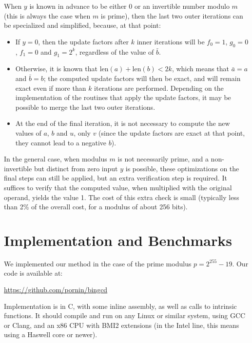 \documentclass{llncs}
\newcommand{\bitlength}{\text{len}}
\begin{document}
When $y$ is known in advance to be either 0 or an invertible number
modulo $m$ (this is always the case when $m$ is prime), then the last
two outer iterations can be specialized and simplified, because, at
that point:
\begin{itemize}

    \item If $y = 0$, then the update factors after $k$ inner
    iterations will be $f_0 = 1$, $g_0 = 0$, $f_1 = 0$ and $g_1 = 2^k$,
    regardless of the value of $\bar b$.

    \item Otherwise, it is known that $\bitlength(a) + \bitlength(b) <
    2k$, which means that $\bar a = a$ and $\bar b = b$; the computed
    update factors will then be exact, and will remain exact even if
    more than $k$ iterations are performed. Depending on the
    implementation of the routines that apply the update factors, it may
    be possible to merge the last two outer iterations.

    \item At the end of the final iteration, it is not necessary to
    compute the new values of $a$, $b$ and $u$, only $v$ (since the
    update factors are exact at that point, they cannot lead to a
    negative $b$).

\end{itemize}

In the general case, when modulus $m$ is not necessarily prime, and a
non-invertible but distinct from zero input $y$ is possible, these
optimizations on the final steps can still be applied, but an extra
verification step is required. It suffices to verify that the computed
value, when multiplied with the original operand, yields the value 1.
The cost of this extra check is small (typically less than 2\% of the
overall cost, for a modulus of about 256 bits).

\section{Implementation and Benchmarks}

We implemented our method in the case of the prime modulus
$p = 2^{255}-19$. Our code is available at:
\begin{center}
    \url{https://github.com/pornin/bingcd}
\end{center}
Implementation is in C, with some inline assembly, as well as calls to
intrinsic functions. It should compile and run on any Linux or similar
system, using GCC or Clang, and an x86 CPU with BMI2 extensions (in the
Intel line, this means using a Haswell core or newer).
\end{document}

